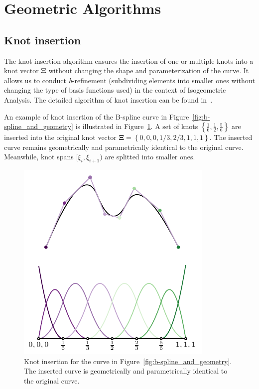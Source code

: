 \section{Geometric Algorithms}\label{sec:geometric_algorithms}

\subsection{Knot insertion}

The knot insertion algorithm ensures the insertion of one or multiple knots into a knot vector $\mathbf{\Xi}$ without changing the shape and parameterization of the curve. It allows us to conduct \textit{h}-refinement (subdividing elements into smaller ones without changing the type of basis functions used) in the context of Isogeometric Analysis. The detailed algorithm of knot insertion can be found in~\cite{piegl2012nurbs}.

An example of knot insertion of the B-spline curve in Figure~\ref{fig:b-spline_and_geometry} is illustrated in Figure~\ref{fig:b-spline_h_refine}. A set of knots $\left\{\frac{1}{6}, \frac{1}{2}, \frac{5}{6}\right\}$ are inserted into the original knot vector $\mathbf{\Xi}=\left\{0,0,0,1/3,2/3,1,1,1\right\}$.  The inserted curve remains geometrically and parametrically identical to the original curve. Meanwhile, knot spans $[ \xi_i,\xi_{i+1} )$ are splitted into smaller ones.

\begin{figure}[ht]
    \center\includegraphics[scale=1.3]{h_refine}
    \caption{Knot insertion for the curve in Figure~\ref{fig:b-spline_and_geometry}. The inserted curve is geometrically and parametrically identical to the original curve.}\label{fig:b-spline_h_refine}
\end{figure}

